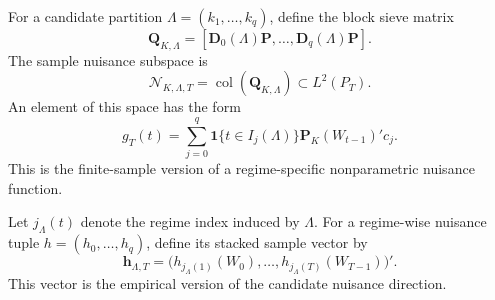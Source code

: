 \documentclass[12pt]{article}
\numberwithin{equation}{section}
\theoremstyle{definition}
\newcommand{\ind}{\mathbf 1}
\newcommand{\N}{\mathcal N}
\newcommand{\LtwoT}{L^2(P_T)}
\begin{document}
For a candidate partition \(\Lambda=(k_1,\ldots,k_q)\), define the block sieve
matrix
\[
    \bm Q_{K,\Lambda}
    =[
      \bm D_0(\Lambda)\bm P,
      \ldots,
      \bm D_q(\Lambda)\bm P
    ].
\]
The sample nuisance subspace is
\begin{equation}
    \N_{K,\Lambda,T}
    =\operatorname{col}(\bm Q_{K,\Lambda})\subset\LtwoT.
    \label{eq:sample-nuisance-space}
\end{equation}
An element of this space has the form
\[
    g_T(t)=\sum_{j=0}^q\ind\{t\in I_j(\Lambda)\}\bm P_K(W_{t-1})'c_j.
\]
This is the finite-sample version of a regime-specific nonparametric nuisance
function.

Let \(j_\Lambda(t)\) denote the regime index induced by \(\Lambda\). For a
regime-wise nuisance tuple \(h=(h_0,\ldots,h_q)\), define its stacked sample
vector by
\[
    \bm h_{\Lambda,T}
    =\big(h_{j_\Lambda(1)}(W_0),\ldots,
          h_{j_\Lambda(T)}(W_{T-1})\big)'.
\]
This vector is the empirical version of the candidate nuisance direction.
\end{document}
